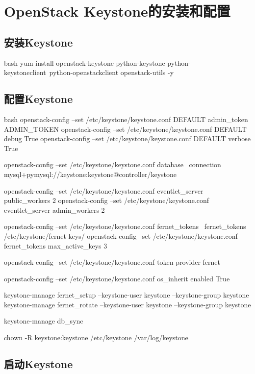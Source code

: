 \section{OpenStack Keystone的安装和配置}

\subsection{安装Keystone}

\begin{code-block}{bash}
yum install openstack-keystone python-keystone python-keystoneclient\
    python-openstackclient openstack-utils -y
\end{code-block}


\subsection{配置Keystone}

\begin{code-block}{bash}
openstack-config --set /etc/keystone/keystone.conf DEFAULT admin_token ADMIN_TOKEN
openstack-config --set /etc/keystone/keystone.conf DEFAULT debug True
openstack-config --set /etc/keystone/keystone.conf DEFAULT verbose True

openstack-config --set /etc/keystone/keystone.conf database \
    connection mysql+pymysql://keystone:keystone@controller/keystone
    
openstack-config --set /etc/keystone/keystone.conf eventlet_server public_workers 2
openstack-config --set /etc/keystone/keystone.conf eventlet_server admin_workers 2

openstack-config --set /etc/keystone/keystone.conf fernet_tokens \
    fernet_tokens /etc/keystone/fernet-keys/
openstack-config --set /etc/keystone/keystone.conf fernet_tokens max_active_keys 3

openstack-config --set /etc/keystone/keystone.conf token provider fernet

openstack-config --set /etc/keystone/keystone.conf os_inherit enabled True

keystone-manage fernet_setup --keystone-user keystone --keystone-group keystone
keystone-manage fernet_rotate --keystone-user keystone --keystone-group keystone

keystone-manage db_sync

chown -R keystone:keystone /etc/keystone /var/log/keystone
\end{code-block}

\subsection{启动Keystone}

